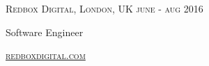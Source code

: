 {
  \textsc{\small{Redbox Digital, London, UK
    \hfill
      {\raggedleft
        june - aug 2016
      } \\
    }
  }
  {\raggedright\large {
      Software Engineer
  }}

  \textsc{\small\href{http://www.redboxdigital.com}{redboxdigital.com}}

  \normalsize{\raggedright
    
  }
}
